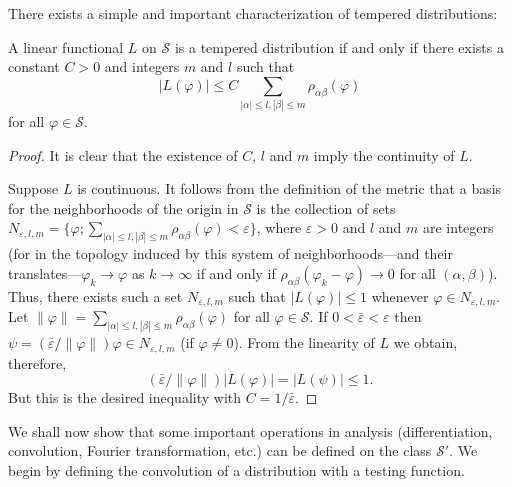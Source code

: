 There exists a simple and important characterization of tempered
distributions:

\begin{theorem}\label{thm:c1-3-11}
A linear functional $L$ on $\mathscr{S}$ is a tempered distribution if and
only if there exists a constant $C > 0$ and integers $m$ and $l$ such that
\[
\left|L(\varphi)\right|\leq C\sum_{|\alpha|\leq l,|\beta|\leq m}\rho_{\alpha\beta}(\varphi)
\]
for all $\varphi \in \mathscr{S}$.
\end{theorem}

\begin{proof}
It is clear that the existence of $C$, $l$ and $m$ imply the continuity of $L$.

Suppose $L$ is continuous. It follows from the definition of the metric that a
basis for the neighborhoods of the origin in $\mathscr{S}$ is the collection
of sets
$N_{\varepsilon,l,m}=\{\varphi; \sum_{|\alpha|\leq l,|\beta|\leq m} \rho_{\alpha\beta}(\varphi) < \varepsilon\}$,
where $\varepsilon > 0$ and $l$ and $m$ are integers (for in the topology
induced by this system of neighborhoods---and their translates---$\varphi_{k} \to \varphi$
as $k \to \infty$ if and only if $\rho_{\alpha\beta}(\varphi_{k} - \varphi) \to 0$
for all $(\alpha, \beta)$). Thus, there exists such a set $N_{\varepsilon,l,m}$
such that $|L(\varphi)| \leq 1$ whenever $\varphi \in N_{\varepsilon,l,m}$. Let
$\|\varphi\| = \sum_{|\alpha|\leq l,|\beta|\leq m} \rho_{\alpha\beta}(\varphi)$
for all $\varphi \in \mathscr{S}$. If $0 < \bar{\varepsilon} < \varepsilon$
then $\psi = (\bar{\varepsilon}/\|\varphi\|)\varphi \in N_{\varepsilon,l,m}$
(if $\varphi \neq 0$). From the linearity of $L$ we obtain, therefore,
\[
(\bar{\varepsilon}/\|\varphi\|)|L(\varphi)|=|L(\psi)|\leq1.
\]
But this is the desired inequality with $C = 1/\bar{\varepsilon}$.
\end{proof}

We shall now show that some important operations in analysis
(differentiation, convolution, Fourier transformation, etc.) can be defined on
the class $\mathscr{S}'$. We begin by defining the convolution of a
distribution with a testing function.


